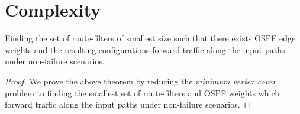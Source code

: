 \section{Complexity}
\begin{theorem}
Finding the set of route-filters of smallest size such that there exists OSPF
edge weights and the resulting configurations forward traffic along the
input paths under non-failure scenarios.
\end{theorem}

\begin{proof}
We prove the above theorem by reducing the \emph{minimum vertex cover} problem
to finding the smallest set of route-filters and OSPF weights 
which forward traffic along the
input paths under non-failure scenarios.

\end{proof}